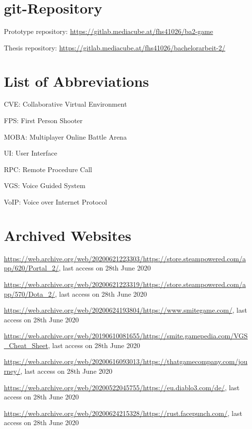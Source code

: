 \begin{appendices}


\section{git-Repository}

Prototype repository: \url{https://gitlab.mediacube.at/fhs41026/ba2-game}

Thesis repository: \url{https://gitlab.mediacube.at/fhs41026/bachelorarbeit-2/}

\section{List of Abbreviations}

CVE: Collaborative Virtual Environment

FPS: First Person Shooter

MOBA: Multiplayer Online Battle Arena

UI: User Interface

RPC: Remote Procedure Call

VGS: Voice Guided System

VoIP: Voice over Internet Protocol

\section{Archived Websites}
\sloppy

\url{https://web.archive.org/web/20200621223303/https://store.steampowered.com/app/620/Portal_2/}, last access on 28th June 2020

\url{https://web.archive.org/web/20200621223319/https://store.steampowered.com/app/570/Dota_2/}, last access on 28th June 2020

\url{https://web.archive.org/web/20200624193804/https://www.smitegame.com/}, last access on 28th June 2020

\url{https://web.archive.org/web/20190610081655/https://smite.gamepedia.com/VGS_Cheat_Sheet}, last access on 28th June 2020

\url{https://web.archive.org/web/20200616093013/https://thatgamecompany.com/journey/}, last access on 28th June 2020

\url{https://web.archive.org/web/20200522045755/https://eu.diablo3.com/de/}, last access on 28th June 2020


\url{https://web.archive.org/web/20200624215328/https://rust.facepunch.com/}, last access on 28th June 2020


\end{appendices}
